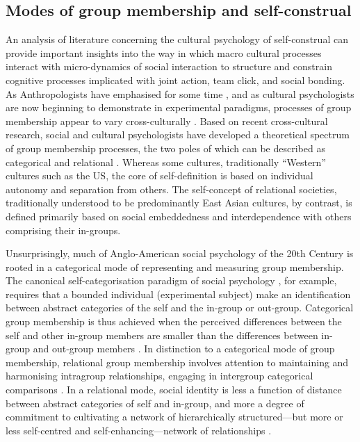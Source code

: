 \subsection{Modes of group membership and self-construal}
An analysis of literature concerning the cultural psychology of self-construal can provide important insights into the way in which macro cultural processes interact with micro-dynamics of social interaction to structure and constrain cognitive processes implicated with joint action, team click, and social bonding.  As Anthropologists have emphasised for some time \citep{Strodtbeck1961,Kluckhohn1961,Mead1967,Fei1992}, and as cultural psychologists are now beginning to demonstrate in experimental paradigms, processes of group membership appear to vary cross-culturally \citep{Markus1991,Nisbett2001}.  Based on recent cross-cultural research, social and cultural psychologists have developed a theoretical spectrum of group membership processes, the two poles of which can be described as categorical and relational \citep{Hofstede1980,Brewer2007}.  Whereas some cultures, traditionally ``Western'' cultures such as the US, the core of self-definition is based on individual autonomy and separation from others.
The self-concept of relational societies, traditionally understood to be predominantly East Asian cultures, by contrast, is defined primarily based on social embeddedness and interdependence with others comprising their in-groups\citep{Leung2012}.

Unsurprisingly, much of Anglo-American social psychology of the 20th Century is rooted in a categorical mode of representing and measuring group membership.  The canonical self-categorisation paradigm of social psychology \citep{Turner1987}, for example, requires that a bounded individual (experimental subject) make an identification between abstract categories of the self and the in-group or out-group.  Categorical group membership is thus achieved when the perceived differences between the self and other in-group members are smaller than the differences between in-group and out-group members \citep{Yuki2014}.  In distinction to a categorical mode of group membership, relational group membership involves attention to maintaining and harmonising intragroup relationships, engaging in intergroup categorical comparisons \citep{Yuki2003}.
In a relational mode, social identity is less a function of distance between abstract categories of self and in-group, and more a degree of commitment to cultivating a network of hierarchically structured---but more or less self-centred and self-enhancing---network of relationships \citep{Liu2009,Nisbett2003}.

